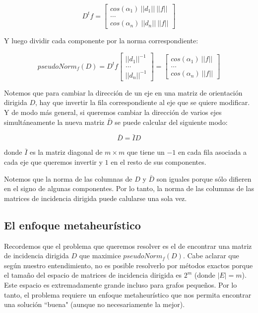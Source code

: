 \documentclass[10pt, a4paper, twocolumn]{article} %
\begin{document}
$$
D^t f = \begin{bmatrix}
	cos(\alpha_1) \ ||d_1|| \ ||f||\\
	\dots \\
	cos(\alpha_n) \ ||d_n|| \ ||f||
\end{bmatrix}
$$

\smallskip

Y luego dividir cada componente por la norma correspondiente:

$$
pseudoNorm_f(D) = D^t f
\begin{bmatrix}
	||d_1||^{-1}\\
	\dots \\
	||d_n||^{-1}
\end{bmatrix} = \begin{bmatrix}
	cos(\alpha_1) \ ||f||\\
	\dots \\
	cos(\alpha_n) \ ||f||
\end{bmatrix}
$$

\smallskip

Notemos que para cambiar la dirección de un eje en una matriz de 
orientación dirigida $D$, hay que invertir la fila correspondiente al 
eje que se quiere modificar. Y de modo más general, si queremos cambiar 
la dirección de varios ejes simultáneamente la nueva matriz $\bar{D}$
se puede calcular del siguiente modo:

$$\bar{D} = \bar{I} D$$

\smallskip

donde $\bar{I}$ es la matriz diagonal de $m \times m$ que tiene un $-1$ 
en cada fila asociada a cada eje que queremos invertir y $1$ en el resto 
de sus componentes.

\smallskip

Notemos que la norma de las columnas de $D$ y $\bar{D}$ son iguales 
porque sólo difieren en el signo de algunas componentes. Por lo tanto, 
la norma de las columnas de las matrices de incidencia dirigida puede 
calularse una sola vez.

\bigskip

\subsection{El enfoque metaheurístico}

Recordemos que el problema que queremos resolver es el de encontrar una 
matriz de incidencia dirigida $D$ que maximice $pseudoNorm_f(D)$. 
Cabe aclarar que según nuestro entendimiento, no es posible resolverlo 
por métodos exactos porque el tamaño del espacio de matrices de 
incidencia dirigida es $2^m$  (donde 
$|E|=m$). Este espacio es extremadamente grande incluso para grafos 
pequeños. Por lo tanto, el problema requiere un enfoque metaheurístico 
que nos permita encontrar una solución ``buena" (aunque no 
necesariamente la mejor).
\end{document}
